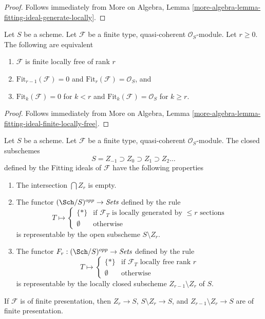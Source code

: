 \begin{proof}
Follows immediately from
More on Algebra, Lemma \ref{more-algebra-lemma-fitting-ideal-generate-locally}.
\end{proof}

\begin{lemma}
\label{lemma-fitting-ideal-finite-locally-free}
Let $S$ be a scheme. Let $\mathcal{F}$ be a finite type, quasi-coherent
$\mathcal{O}_S$-module. Let $r \geq 0$. The following are equivalent
\begin{enumerate}
\item $\mathcal{F}$ is finite locally free of rank $r$
\item $\text{Fit}_{r - 1}(\mathcal{F}) = 0$ and
$\text{Fit}_r(\mathcal{F}) = \mathcal{O}_S$, and
\item $\text{Fit}_k(\mathcal{F}) = 0$ for $k < r$ and
$\text{Fit}_k(\mathcal{F}) = \mathcal{O}_S$ for $k \geq r$.
\end{enumerate}
\end{lemma}

\begin{proof}
Follows immediately from
More on Algebra, Lemma
\ref{more-algebra-lemma-fitting-ideal-finite-locally-free}.
\end{proof}

\begin{lemma}
\label{lemma-locally-free-rank-r-pullback}
Let $S$ be a scheme. Let $\mathcal{F}$ be a finite type, quasi-coherent
$\mathcal{O}_S$-module. The closed subschemes
$$
S = Z_{-1} \supset Z_0 \supset Z_1 \supset Z_2 \ldots
$$
defined by the Fitting ideals of $\mathcal{F}$ have the following
properties
\begin{enumerate}
\item The intersection $\bigcap Z_r$ is empty.
\item The functor $(\Sch/S)^{opp} \to \textit{Sets}$ defined by the rule
$$
T \longmapsto
\left\{
\begin{matrix}
\{*\} & \text{if }\mathcal{F}_T\text{ is locally generated by }
\leq r\text{ sections} \\
\emptyset & \text{otherwise}
\end{matrix}
\right.
$$
is representable by the open subscheme $S \setminus Z_r$.
\item The functor $F_r : (\Sch/S)^{opp} \to \textit{Sets}$ defined by the rule
$$
T \longmapsto
\left\{
\begin{matrix}
\{*\} & \text{if }\mathcal{F}_T\text{ locally free rank }r\\
\emptyset & \text{otherwise}
\end{matrix}
\right.
$$
is representable by the locally closed subscheme $Z_{r - 1} \setminus Z_r$
of $S$.
\end{enumerate}
If $\mathcal{F}$ is of finite presentation, then
$Z_r \to S$, $S \setminus Z_r \to S$, and $Z_{r - 1} \setminus Z_r \to S$
are of finite presentation.
\end{lemma}

